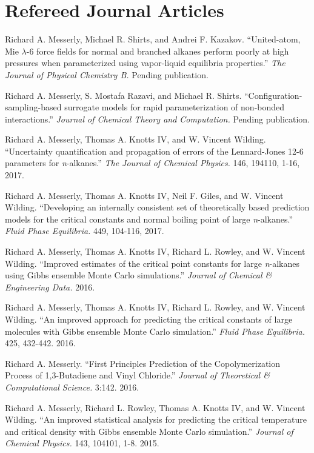 \documentclass[12pt]{article}
\begin{document}

\section*{Refereed Journal Articles}

\begin{etaremune}

\item Richard A. Messerly, Michael R. Shirts, and Andrei F. Kazakov. ``United-atom, Mie $\lambda$-6 force fields for normal and branched alkanes perform poorly at high pressures when parameterized using vapor-liquid equilibria properties.'' \textit{The Journal of Physical Chemistry B.} Pending publication.
	
\item Richard A. Messerly, S. Mostafa Razavi, and Michael R. Shirts. ``Configuration-sampling-based surrogate models for rapid parameterization of non-bonded interactions.'' \textit{Journal of Chemical Theory and Computation.} Pending publication.
	
\item Richard A. Messerly, Thomas A. Knotts IV, and W. Vincent Wilding. ``Uncertainty quantification and propagation of errors of the Lennard-Jones 12-6 parameters for \textit{n}-alkanes.'' \textit{The Journal of Chemical Physics.} 146, 194110, 1-16, 2017.

\item Richard A. Messerly, Thomas A. Knotts IV, Neil F. Giles, and W. Vincent Wilding. ``Developing an internally consistent set of theoretically based prediction models for the critical constants and normal boiling point of large \textit{n}-alkanes.'' \textit{Fluid Phase Equilibria.} 449, 104-116, 2017.

\item Richard A. Messerly, Thomas A. Knotts IV, Richard L. Rowley, and W. Vincent Wilding. ``Improved estimates of the critical point constants for large \textit{n}-alkanes using Gibbs ensemble Monte Carlo simulations.'' \textit{Journal of Chemical \& Engineering Data.} 2016.

\item Richard A. Messerly, Thomas A. Knotts IV, Richard L. Rowley, and W. Vincent Wilding. ``An improved approach for predicting the critical constants of large molecules with Gibbs ensemble Monte Carlo simulation.'' \textit{Fluid Phase Equilibria.} 425, 432-442. 2016.

\item Richard A. Messerly. ``First Principles Prediction of the Copolymerization Process of 1,3-Butadiene and Vinyl Chloride.'' \textit{Journal of Theoretical \& Computational Science.} 3:142. 2016.

\item Richard A. Messerly, Richard L. Rowley, Thomas A. Knotts IV, and W. Vincent Wilding. ``An improved statistical analysis for predicting the critical temperature and critical density with Gibbs ensemble Monte Carlo simulation.'' \textit{Journal of Chemical Physics.} 143, 104101, 1-8. 2015.



\end{etaremune}
\end{document}
